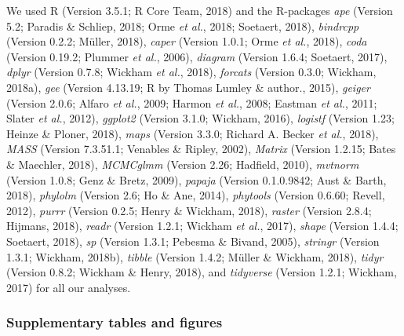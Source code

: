 \documentclass[man,floatsintext]{apa6}
\theoremstyle{definition}
\theoremstyle{definition}
\theoremstyle{definition}
\theoremstyle{remark}
\begin{document}
We used R (Version 3.5.1; R Core Team, 2018) and the R-packages
\emph{ape} (Version 5.2; Paradis \& Schliep, 2018; Orme \emph{et al.},
2018; Soetaert, 2018), \emph{bindrcpp} (Version 0.2.2; Müller, 2018),
\emph{caper} (Version 1.0.1; Orme \emph{et al.}, 2018), \emph{coda}
(Version 0.19.2; Plummer \emph{et al.}, 2006), \emph{diagram} (Version
1.6.4; Soetaert, 2017), \emph{dplyr} (Version 0.7.8; Wickham \emph{et
al.}, 2018), \emph{forcats} (Version 0.3.0; Wickham, 2018a), \emph{gee}
(Version 4.13.19; R by Thomas Lumley \& author., 2015), \emph{geiger}
(Version 2.0.6; Alfaro \emph{et al.}, 2009; Harmon \emph{et al.}, 2008;
Eastman \emph{et al.}, 2011; Slater \emph{et al.}, 2012), \emph{ggplot2}
(Version 3.1.0; Wickham, 2016), \emph{logistf} (Version 1.23; Heinze \&
Ploner, 2018), \emph{maps} (Version 3.3.0; Richard A. Becker \emph{et
al.}, 2018), \emph{MASS} (Version 7.3.51.1; Venables \& Ripley, 2002),
\emph{Matrix} (Version 1.2.15; Bates \& Maechler, 2018), \emph{MCMCglmm}
(Version 2.26; Hadfield, 2010), \emph{mvtnorm} (Version 1.0.8; Genz \&
Bretz, 2009), \emph{papaja} (Version 0.1.0.9842; Aust \& Barth, 2018),
\emph{phylolm} (Version 2.6; Ho \& Ane, 2014), \emph{phytools} (Version
0.6.60; Revell, 2012), \emph{purrr} (Version 0.2.5; Henry \& Wickham,
2018), \emph{raster} (Version 2.8.4; Hijmans, 2018), \emph{readr}
(Version 1.2.1; Wickham \emph{et al.}, 2017), \emph{shape} (Version
1.4.4; Soetaert, 2018), \emph{sp} (Version 1.3.1; Pebesma \& Bivand,
2005), \emph{stringr} (Version 1.3.1; Wickham, 2018b), \emph{tibble}
(Version 1.4.2; Müller \& Wickham, 2018), \emph{tidyr} (Version 0.8.2;
Wickham \& Henry, 2018), and \emph{tidyverse} (Version 1.2.1; Wickham,
2017) for all our analyses. \newpage

\hypertarget{supplementary-tables-and-figures}{%
\subsubsection{Supplementary tables and
figures}\label{supplementary-tables-and-figures}}
\end{document}
